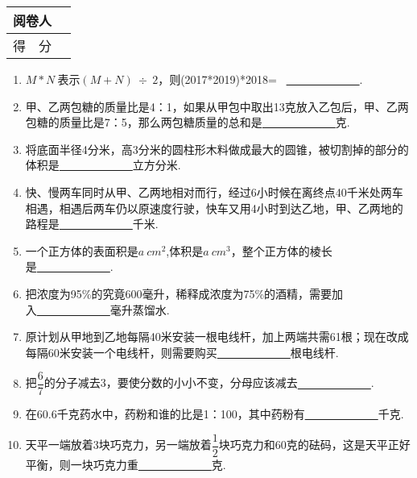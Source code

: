 \documentclass[onecolumn,landscape,UTF8]{ctexart}
\begin{document}
\begin{tabular}{|p{}|p{}|}
			\hline
			\centering 阅卷人& \\
			\hline
			\centering 得~~分 &  \\
			\hline
		\end{tabular}
		\begin{enumerate}\setcounter{enumi}{0}
			\item $M*N~$表示$(M+N)~\div~2$，则(2017*2019)*2018= ~\underline{~~~~~~~~~~~~~}.
			
			\item 甲、乙两包糖的质量比是4：1，如果从甲包中取出13克放入乙包后，甲、乙两包糖的质量比是7：5，那么两包糖质量的总和是\underline{~~~~~~~~~~~~~}克.
			
			\item 将底面半径4分米，高3分米的圆柱形木料做成最大的圆锥，被切割掉的部分的体积是\underline{~~~~~~~~~~~~~}立方分米.
			
            \item 快、慢两车同时从甲、乙两地相对而行，经过6小时候在离终点40千米处两车相遇，相遇后两车仍以原速度行驶，快车又用4小时到达乙地，甲、乙两地的路程是\underline{~~~~~~~~~~~~~}千米.
			
			\item 一个正方体的表面积是$a~cm^2$,体积是$a~cm^3$，整个正方体的棱长是\underline{~~~~~~~~~~~~~}.

            \item 把浓度为95\%的究竟600毫升，稀释成浓度为75\%的酒精，需要加入\underline{~~~~~~~~~~~~~}毫升蒸馏水.

            \item 原计划从甲地到乙地每隔40米安装一根电线杆，加上两端共需61根；现在改成每隔60米安装一个电线杆，则需要购买\underline{~~~~~~~~~~~~~}根电线杆.

            \item 把$\dfrac{6}{7}$的分子减去3，要使分数的小小不变，分母应该减去\underline{~~~~~~~~~~~~~}.

            \item 在60.6千克药水中，药粉和谁的比是1：100，其中药粉有\underline{~~~~~~~~~~~~~}千克.

            \item 天平一端放着3块巧克力，另一端放着$\dfrac{1}{2}$块巧克力和60克的砝码，这是天平正好平衡，则一块巧克力重\underline{~~~~~~~~~~~~~}克.

		\end{enumerate}
\newpage
\end{document}
